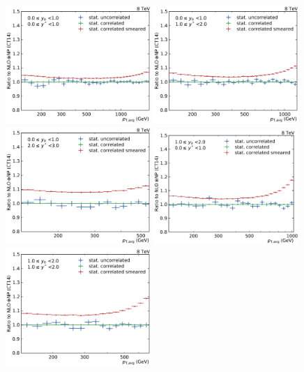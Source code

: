 \begin{figure}[htp]
    \centering
    \includegraphics[width=0.49\textwidth]{figures/measurement/unf_nlo_check_yb0ys0.pdf}\hfill
    \includegraphics[width=0.49\textwidth]{figures/measurement/unf_nlo_check_yb0ys1.pdf}
    \includegraphics[width=0.49\textwidth]{figures/measurement/unf_nlo_check_yb0ys2.pdf}\hfill
    \includegraphics[width=0.49\textwidth]{figures/measurement/unf_nlo_check_yb1ys0.pdf}
    \includegraphics[width=0.49\textwidth]{figures/measurement/unf_nlo_check_yb1ys1.pdf}\hfill

\end{figure}
